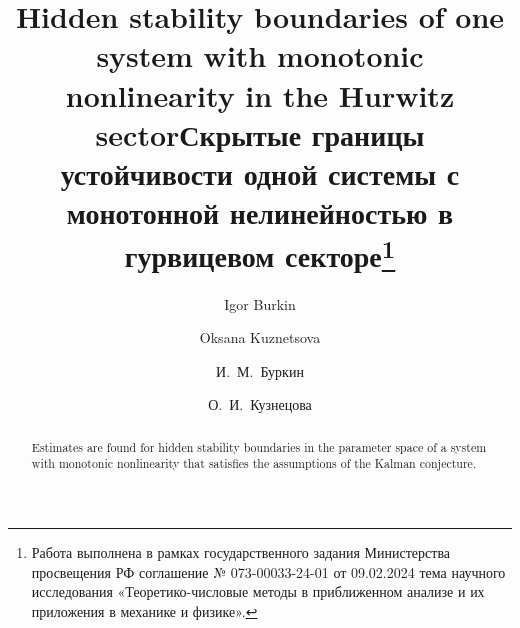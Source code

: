 \begin{englishtitle} %
\title{Hidden stability boundaries of one system with monotonic nonlinearity in the Hurwitz sector}
\author{Igor Burkin  \and  Oksana Kuznetsova
}

\maketitle

\begin{abstract}
Estimates are found for hidden stability boundaries in the parameter space of a system with monotonic nonlinearity that satisfies the assumptions of the Kalman conjecture. 

\end{abstract}
\end{englishtitle}

\iffalse
%
%


\documentclass[12pt]{llncs}  


\usepackage{iftex}

\ifPDFTeX
\usepackage[T2A]{fontenc}
\usepackage[utf8]{inputenc} %
\usepackage[english,russian]{babel}
\fi

\usepackage{todonotes} 

\usepackage[russian]{nla}
\newcommand{\sign}{\mathop{\mathrm{sign}}}

\fi

\title{Скрытые границы устойчивости одной системы с монотонной нелинейностью в гурвицевом секторе\thanks{Работа выполнена в рамках государственного задания Министерства просвещения РФ соглашение № 073-00033-24-01 от 09.02.2024 тема научного исследования «Теоретико-числовые методы в приближенном анализе и их приложения в механике и физике».}}
\author{И.~М.~Буркин \and О.~И.~Кузнецова
}


